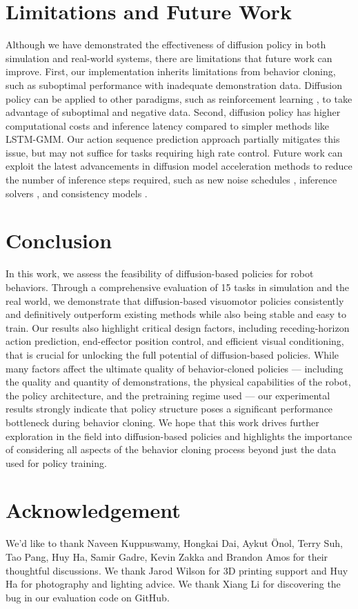 
\section{Limitations and Future Work}

Although we have demonstrated the effectiveness of diffusion policy in both simulation and real-world systems, there are limitations that future work can improve.
First, our implementation inherits limitations from behavior cloning, such as suboptimal performance with inadequate demonstration data. Diffusion policy can be applied to other paradigms, such as reinforcement learning \cite{wang2023diffusion,hansen2023idql}, to take advantage of suboptimal and negative data.
Second, diffusion policy has higher computational costs and inference latency compared to simpler methods like LSTM-GMM. Our action sequence prediction approach partially mitigates this issue, but may not suffice for tasks requiring high rate control. Future work can exploit the latest advancements in diffusion model acceleration methods to reduce the number of inference steps required, such as new noise schedules \cite{chen2023importance}, inference solvers \cite{karras2022elucidating}, and consistency models \cite{song2023consistency}.


\section{Conclusion}

In this work, we assess the feasibility of diffusion-based policies for robot behaviors. Through a comprehensive evaluation of 15 tasks in simulation and the real world, we demonstrate that diffusion-based visuomotor policies consistently and definitively outperform existing methods while also being stable and easy to train. Our results also highlight critical design factors, including receding-horizon action prediction, end-effector position control, and efficient visual conditioning, that is crucial for unlocking the full potential of diffusion-based policies. While many factors affect the ultimate quality of behavior-cloned policies --- including the quality and quantity of demonstrations, the physical capabilities of the robot, the policy architecture, and the pretraining regime used --- our experimental results strongly indicate that policy structure poses a significant performance bottleneck during behavior cloning. We hope that this work drives further exploration in the field into diffusion-based policies and highlights the importance of considering all aspects of the behavior cloning process beyond just the data used for policy training.


\section{Acknowledgement}

We'd like to thank Naveen Kuppuswamy, Hongkai Dai, Aykut Önol, Terry Suh, Tao Pang, Huy Ha, Samir Gadre, Kevin Zakka and Brandon Amos for their thoughtful discussions. We thank Jarod Wilson for 3D printing support and Huy Ha for photography and lighting advice. We thank Xiang Li for discovering the bug in our evaluation code on GitHub.

